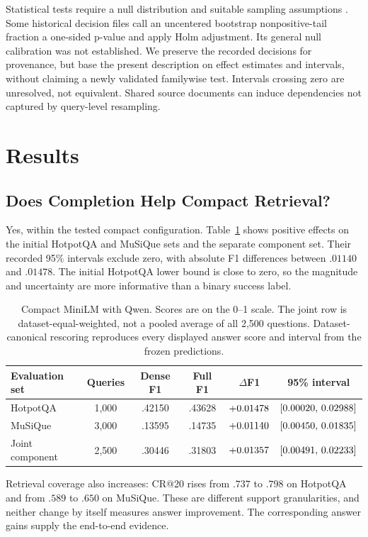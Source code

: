 \documentclass[11pt]{article}
\begin{document}
Statistical tests require a null distribution and suitable sampling assumptions
\citep{dror2018hitchhiker}. Some historical decision files call an uncentered
bootstrap nonpositive-tail fraction a one-sided p-value and apply Holm
adjustment. Its general null calibration was not established. We preserve the
recorded decisions for provenance, but base the present description on effect
estimates and intervals, without claiming a newly validated familywise test.
Intervals crossing zero are unresolved, not equivalent. Shared source
documents can induce dependencies not captured by query-level resampling.

\section{Results}
\subsection{Does Completion Help Compact Retrieval?}
Yes, within the tested compact configuration. Table~\ref{tab:compact} shows
positive effects on the initial HotpotQA and MuSiQue sets and the separate
component set. Their recorded 95\% intervals exclude zero, with absolute
F1 differences between $.01140$ and $.01478$. The initial HotpotQA lower
bound is close to zero, so the magnitude and uncertainty are more informative
than a binary success label.

\begin{table}[t]
\centering\small
\begin{tabular}{@{}lccccc@{}}
\toprule
Evaluation set & Queries & Dense F1 & Full F1 & $\Delta$F1 & 95\% interval\\
\midrule
HotpotQA & 1,000 & .42150 & .43628 & $+0.01478$ & $[0.00020,\,0.02988]$\\
MuSiQue & 3,000 & .13595 & .14735 & $+0.01140$ & $[0.00450,\,0.01835]$\\
Joint component & 2,500 & .30446 & .31803 & $+0.01357$ & $[0.00491,\,0.02233]$\\
\bottomrule
\end{tabular}
\caption{Compact MiniLM with Qwen. Scores are on the 0--1 scale. The joint row
is dataset-equal-weighted, not a pooled average of all 2,500 questions.
Dataset-canonical rescoring reproduces every displayed answer score and
interval from the frozen predictions.}
\label{tab:compact}
\end{table}

Retrieval coverage also increases: CR@20 rises from $.737$ to $.798$ on
HotpotQA and from $.589$ to $.650$ on MuSiQue. These are different support
granularities, and neither change by itself measures answer improvement.
The corresponding answer gains supply the end-to-end evidence.
\end{document}
